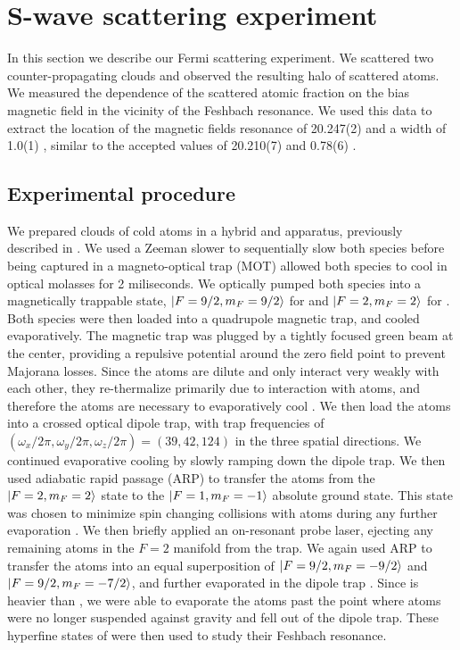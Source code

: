 \documentclass[12pt]{iopart}
\begin{document}
\section{S-wave scattering experiment}
In this section we describe our Fermi scattering experiment. We scattered two counter-propagating \K{} clouds and observed the resulting \swave{} halo of scattered atoms.  We measured the dependence of the scattered atomic fraction on the bias magnetic field in the vicinity of the Feshbach resonance. We used this data to extract the location of the magnetic fields resonance of 20.247(2)  \mT{} and a width of 1.0(1)  \mT{}, similar to the accepted values of 20.210(7) \mT{} and 0.78(6) \mT{} \cite{Regal04}.
\subsection{Experimental procedure}
We prepared clouds of cold \K{} atoms in a hybrid \K{} and \Rb{} apparatus, previously described in \cite{Williams13, Lin09, KarinaThesis}. We used a Zeeman slower to sequentially slow both species before being captured in a magneto-optical trap (MOT) allowed both species to cool in optical molasses for 2 miliseconds. We optically pumped both species into a magnetically trappable state, $\mathinner{|{F=9/2, m_F=9/2}\rangle}$ for \K{} and $\mathinner{|{F=2,m_F=2}\rangle}$ for \Rb{}. Both species were then loaded into a quadrupole magnetic trap, and cooled evaporatively. The magnetic trap was plugged by a tightly focused green beam at the center, providing a repulsive potential around the zero field point to prevent Majorana losses. Since the \K{} atoms are dilute and only interact very weakly with each other, they re-thermalize primarily due to interaction with \Rb{} atoms, and therefore the \Rb{} atoms are necessary to evaporatively cool \K{}. We then load the atoms into a crossed optical dipole trap, with trap frequencies of $(\omega_x/2\pi,\omega_y/2\pi,\omega_z/2\pi) =(39, 42, 124)$ in the three spatial directions. We continued evaporative cooling by slowly ramping down the dipole trap. We then used adiabatic rapid passage (ARP) to transfer the \Rb{} atoms from the $\mathinner{|{F=2, m_F=2}\rangle}$ state to the  $\mathinner{|{F=1, m_F=-1}\rangle}$ absolute ground state. This state was chosen to minimize spin changing collisions with \K{} atoms during any further evaporation \cite{BestThesis}.  We then briefly applied an on-resonant probe laser, ejecting any remaining \Rb{} atoms in the $F=2$ manifold from the trap. We again used ARP to transfer the \K{} atoms into an equal superposition of $\mathinner{|{F=9/2,m_F=-9/2}\rangle}$ and $\mathinner{|{F=9/2,m_F=-7/2}\rangle}$, and further evaporated in the dipole trap \cite{DeMarco99}. Since \Rb{} is heavier than \K{}, we were able to evaporate the \K{} atoms past the point where \Rb{} atoms were no longer suspended against gravity and fell out of the dipole trap.  These hyperfine states of \K{} were then used to study their Feshbach resonance. 
\end{document}
